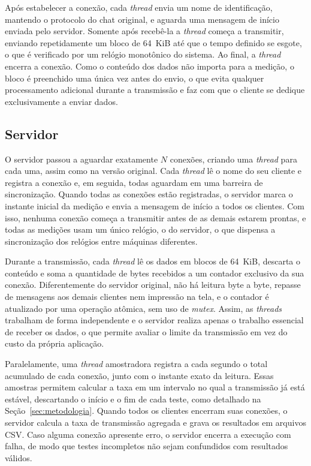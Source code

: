 \documentclass[12pt]{article}
\begin{document}
Após estabelecer a conexão, cada \textit{thread} envia um nome de identificação,
mantendo o protocolo do chat original, e aguarda uma mensagem de início enviada
pelo servidor. Somente após recebê-la a \textit{thread} começa a transmitir,
enviando repetidamente um bloco de 64~KiB até que o tempo definido se esgote, o
que é verificado por um relógio monotônico do sistema. Ao final, a
\textit{thread} encerra a conexão. Como o conteúdo dos dados não importa para a
medição, o bloco é preenchido uma única vez antes do envio, o que evita qualquer
processamento adicional durante a transmissão e faz com que o cliente se dedique
exclusivamente a enviar dados.

\subsection{Servidor}

O servidor passou a aguardar exatamente $N$ conexões, criando uma
\textit{thread} para cada uma, assim como na versão original. Cada
\textit{thread} lê o nome do seu cliente e registra a conexão e, em seguida,
todas aguardam em uma barreira de sincronização. Quando todas as conexões estão
registradas, o servidor marca o instante inicial da medição e envia a mensagem
de início a todos os clientes. Com isso, nenhuma conexão começa a transmitir
antes de as demais estarem prontas, e todas as medições usam um único relógio, o
do servidor, o que dispensa a sincronização dos relógios entre máquinas
diferentes.

Durante a transmissão, cada \textit{thread} lê os dados em blocos de 64~KiB,
descarta o conteúdo e soma a quantidade de bytes recebidos a um contador
exclusivo da sua conexão. Diferentemente do servidor original, não há leitura
byte a byte, repasse de mensagens aos demais clientes nem impressão na tela, e o
contador é atualizado por uma operação atômica, sem uso de \textit{mutex}.
Assim, as \textit{threads} trabalham de forma independente e o servidor realiza
apenas o trabalho essencial de receber os dados, o que permite avaliar o limite
da transmissão em vez do custo da própria aplicação.

Paralelamente, uma \textit{thread} amostradora registra a cada segundo o total
acumulado de cada conexão, junto com o instante exato da leitura. Essas amostras
permitem calcular a taxa em um intervalo no qual a transmissão já está estável,
descartando o início e o fim de cada teste, como detalhado na
Seção~\ref{sec:metodologia}. Quando todos os clientes encerram suas conexões, o
servidor calcula a taxa de transmissão agregada e grava os resultados em
arquivos CSV. Caso alguma conexão apresente erro, o servidor encerra a execução
com falha, de modo que testes incompletos não sejam confundidos com resultados
válidos.
\end{document}
